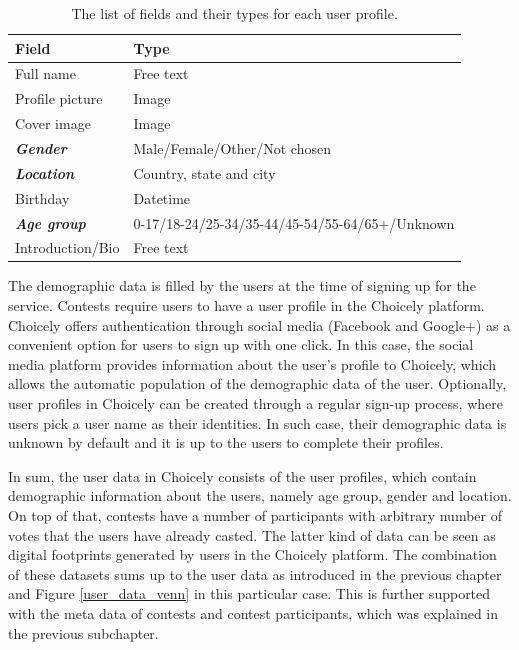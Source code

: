 \begin{table}[H]
    \centering
    \begin{adjustbox}{width=0.8\textwidth}
        \begin{tabular}{l|l}
            \textbf{Field}              & \textbf{Type} \\
            \hline
            Full name                   & Free text \\
            Profile picture             & Image \\ 
            Cover image                 & Image \\
            \textbf{\textit{Gender}}    & Male/Female/Other/Not chosen \\
            \textbf{\textit{Location}}  & Country, state and city \\
            Birthday                    & Datetime \\ 
            \textbf{\textit{Age group}} & 0-17/18-24/25-34/35-44/45-54/55-64/65+/Unknown \\
            Introduction/Bio            & Free text
        \end{tabular}
    \end{adjustbox}
    \caption{The list of fields and their types for each user profile.}
    \label{user_profile_fields}
\end{table}  

The demographic data is filled by the users at the time of signing up for the service. Contests require users to have a user profile in the Choicely platform. Choicely offers authentication through social media (Facebook and Google+) as a convenient option for users to sign up with one click. In this case, the social media platform provides information about the user's profile to Choicely, which allows the automatic population of the demographic data of the user. Optionally, user profiles in Choicely can be created through a regular sign-up process, where users pick a user name as their identities. In such case, their demographic data is unknown by default and it is up to the users to complete their profiles. 

In sum, the user data in Choicely consists of the user profiles, which contain demographic information about the users, namely age group, gender and location. On top of that, contests have a number of participants with arbitrary number of votes that the users have already casted. The latter kind of data can be seen as digital footprints generated by users in the Choicely platform. The combination of these datasets sums up to the user data as introduced in the previous chapter and Figure \ref{user_data_venn} in this particular case. This is further supported with the meta data of contests and contest participants, which was explained in the previous subchapter.
    
